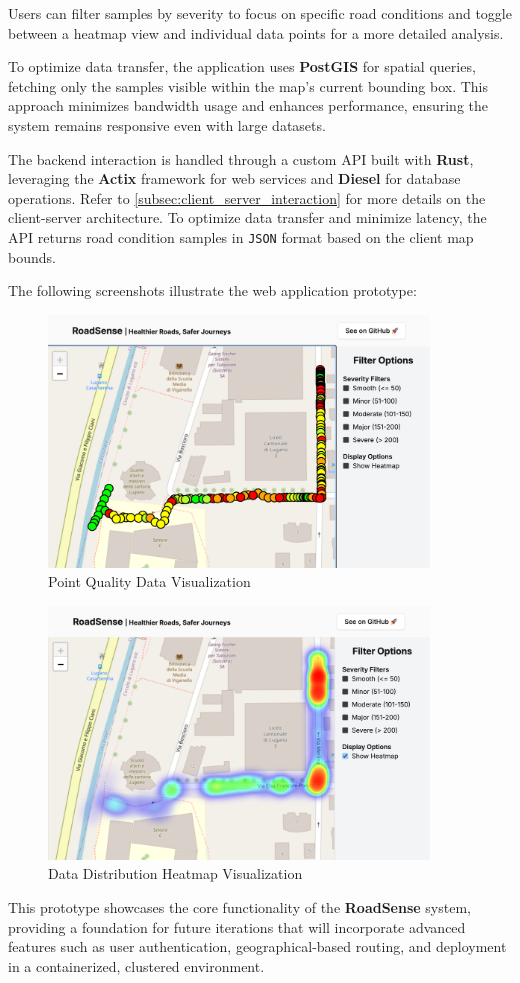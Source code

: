 \noindent Users can filter samples by severity to focus on specific road conditions and toggle between a heatmap view and individual data points for a more detailed analysis.

To optimize data transfer, the application uses \textbf{PostGIS} for spatial queries, fetching only the samples visible within the map's current bounding box. This approach minimizes bandwidth usage and enhances performance, ensuring the system remains responsive even with large datasets.

The backend interaction is handled through a custom API built with \textbf{Rust}, leveraging the \textbf{Actix} framework for web services and \textbf{Diesel} for database operations. Refer to \autoref{subsec:client_server_interaction} for more details on the client-server architecture. To optimize data transfer and minimize latency, the API returns road condition samples in \texttt{JSON} format based on the client map bounds. 

The following screenshots illustrate the web application prototype:

\begin{figure}[H]
	\centering
	\includegraphics[width=0.9\textwidth]{../../assets/images/roadsense_webapp_points.png}
	\caption{Point Quality Data Visualization}
	\label{fig:point_quality_data}
\end{figure}

\begin{figure}[H]
	\centering
	\includegraphics[width=0.9\textwidth]{../../assets/images/roadsense_webapp_heat.png}
	\caption{Data Distribution Heatmap Visualization}
	\label{fig:data_distribution_heatmap}
\end{figure}


\noindent This prototype showcases the core functionality of the \textbf{RoadSense} system, providing a foundation for future iterations that will incorporate advanced features such as user authentication, geographical-based routing, and deployment in a containerized, clustered environment.
